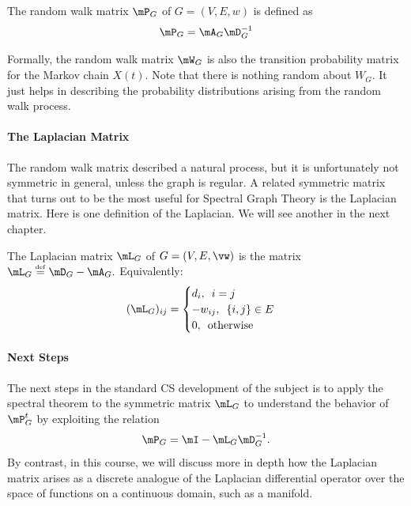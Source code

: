 

\begin{definition}
The random walk matrix $\mP_G$ of $G=(V,E,w)$ is defined as
$$
{\mP_G} = {\mA}_G {\mD}_G^{-1}
$$
\end{definition}
Formally, the random walk matrix $\mW_G$ is also the transition probability matrix for the Markov chain $X(t)$. 
%
Note that there is nothing random about ${W}_G$. It just helps in describing the probability distributions arising from the random walk process.



\paragraph{The Laplacian Matrix} The random walk matrix described a natural process, but it is unfortunately not symmetric in general, unless the graph is regular. A related symmetric matrix that turns out to be the most useful for Spectral Graph Theory is the Laplacian matrix. Here is one definition of the Laplacian. We will see another in the next chapter.

\begin{definition} \label{def:laplacian}
The Laplacian matrix $\mL_G$ of $G=(V,E,\vw)$ is the matrix $\mL_G \defeq \mD_G - \mA_G.$ Equivalently:
$$
(\mL_G)_ {ij}= 
							\begin{cases}
							d_i, \enspace i=j\\
							-w_{ij}, \enspace \{i,j\} \in E \\
							0,       \enspace \textrm{otherwise}
							\end{cases}
$$
\end{definition}

\paragraph{Next Steps}
The next steps in the standard CS development of the subject is to apply the spectral theorem to the symmetric matrix $\mL_G$ to understand the behavior of $\mP^t_G$ by exploiting the relation
$$
\mP_G = \mI - \mL_G \mD_G^{-1}.
$$
By contrast, in this course, we will discuss more in depth how the Laplacian matrix arises as a discrete analogue of the Laplacian differential operator over the space of functions on a continuous domain, such as a manifold. 

